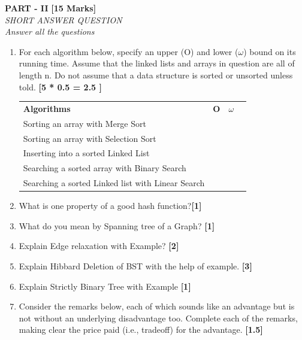 \documentclass[12pt ,a4paper]{exam}
\begin{document}
	\vspace{0.1mm}
	\pagebreak
	\begin{center}
		\textbf{PART - II} \textbf{[15 Marks]}\\
		\noindent \textit{SHORT ANSWER QUESTION} \\
		\noindent \textit{Answer all the questions} 
	\end{center}

	\begin{enumerate}[start=1,label={\bfseries Q\arabic*)}]
		\item For each algorithm below, specify an upper (O) and lower ($\omega$) bound on its running time.  Assume that the linked lists and arrays in question are all of length n. Do not assume that a data structure is sorted or unsorted unless told. \hfill \textbf{ [5 * 0.5 = 2.5 ]}	
		\begin{table}[h]
			\centering
			\begin{tabular}{|l|l|l|l}
				\cline{1-3}
				\textbf{Algorithms} & \textbf{O} & \textbf{$\omega$}  &  \\ \cline{1-3}
				Sorting an array with Merge Sort&   &     &  \\ \cline{1-3}
				Sorting an array with Selection Sort&   &   &  \\ \cline{1-3}
				Inserting into a sorted Linked List&   &   &  \\ \cline{1-3}
				Searching a sorted array with Binary Search&    &   &  \\ \cline{1-3}
				Searching a sorted Linked list with Linear Search&   &    &  \\ \cline{1-3}
			\end{tabular}
		\end{table}
		\item What is one property of a good hash function?\hfill \textbf{[1]}
		\item What do you mean by Spanning tree of a Graph? \hfill \textbf{[1]}
	    \item Explain Edge relaxation with Example? \hfill \textbf{[2]}
	    \item Explain Hibbard Deletion of BST with the help of example. \hfill \textbf{[3]}
	    \item Explain Strictly Binary Tree with Example \hfill \textbf{[1]}
	    \item Consider the remarks below, each of which sounds like an advantage but is not without an underlying disadvantage too. Complete each of the remarks, making clear the price paid (i.e., tradeoff) for the advantage. \hfill \textbf{[1.5]}

\end{enumerate}
\end{document}

